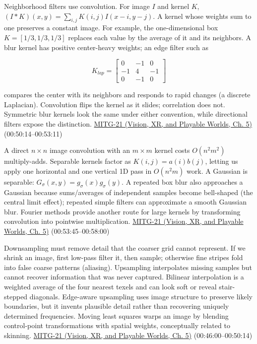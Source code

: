 Neighborhood filters use convolution. For image \(I\) and kernel \(K\), \((I*K)(x,y)=\sum_{i,j}K(i,j)I(x-i,y-j)\). A kernel whose weights sum to one preserves a constant image. For example, the one-dimensional box \(K=[1/3,1/3,1/3]\) replaces each value by the average of it and its neighbors. A blur kernel has positive center-heavy weights; an edge filter such as

\[
K_{lap}=\begin{bmatrix}0&-1&0\\-1&4&-1\\0&-1&0\end{bmatrix}
\]

compares the center with its neighbors and responds to rapid changes (a discrete Laplacian). Convolution flips the kernel as it slides; correlation does not. Symmetric blur kernels look the same under either convention, while directional filters expose the distinction. \href{../07-Vision-XR-and-Playable-Worlds/main.pdf\#nameddest=04-visual-computing-ii-ch036-mitg-21---image-processing}{MITG-21 (Vision, XR, and Playable Worlds, Ch. 5)} (00:50:14--00:53:11)

A direct \(n\times n\) image convolution with an \(m\times m\) kernel costs \(O(n^2m^2)\) multiply-adds. Separable kernels factor as \(K(i,j)=a(i)b(j)\), letting us apply one horizontal and one vertical 1D pass in \(O(n^2m)\) work. A Gaussian is separable: \(G_\sigma(x,y)=g_\sigma(x)g_\sigma(y)\). A repeated box blur also approaches a Gaussian because sums/averages of independent samples become bell-shaped (the central limit effect); repeated simple filters can approximate a smooth Gaussian blur. Fourier methods provide another route for large kernels by transforming convolution into pointwise multiplication. \href{../07-Vision-XR-and-Playable-Worlds/main.pdf\#nameddest=04-visual-computing-ii-ch036-mitg-21---image-processing}{MITG-21 (Vision, XR, and Playable Worlds, Ch. 5)} (00:53:45--00:58:00)

Downsampling must remove detail that the coarser grid cannot represent. If we shrink an image, first low-pass filter it, then sample; otherwise fine stripes fold into false coarse patterns (aliasing). Upsampling interpolates missing samples but cannot recover information that was never captured. Bilinear interpolation is a weighted average of the four nearest texels and can look soft or reveal stair-stepped diagonals. Edge-aware upsampling uses image structure to preserve likely boundaries, but it invents plausible detail rather than recovering uniquely determined frequencies. Moving least squares warps an image by blending control-point transformations with spatial weights, conceptually related to skinning. \href{../07-Vision-XR-and-Playable-Worlds/main.pdf\#nameddest=04-visual-computing-ii-ch036-mitg-21---image-processing}{MITG-21 (Vision, XR, and Playable Worlds, Ch. 5)} (00:46:00--00:50:14)

